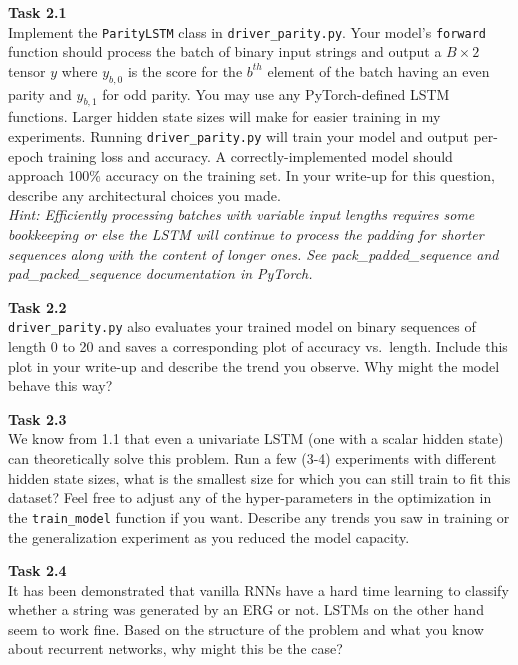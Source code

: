 \documentclass[12pt,article]{article}
\newenvironment{task}[2][Task]
    { \begin{mdframed}[backgroundcolor=gray!20] \textbf{#1 #2} \\}
    {  \end{mdframed}}
\begin{document}
\newpage
\begin{task}{2.1} 
Implement the \texttt{ParityLSTM} class in \texttt{driver\_parity.py}. Your model's \texttt{forward} function should process the batch of binary input strings and output a $B \times 2$ tensor $y$ where $y_{b,0}$ is the score for the $b^{th}$ element of the batch having an even parity and $y_{b,1}$ for odd parity. You may use any PyTorch-defined LSTM functions. Larger hidden state sizes will make for easier training in my experiments. Running \texttt{driver\_parity.py} will train your model and output per-epoch training loss and accuracy. A correctly-implemented model should approach 100\% accuracy on the training set. In your write-up for this question, describe any architectural choices you made.\\[5pt]

\emph{Hint: Efficiently processing batches with variable input lengths requires some bookkeeping or else the LSTM will continue to process the padding for shorter sequences along with the content of longer ones. See pack\_padded\_sequence and pad\_packed\_sequence documentation in PyTorch.}
\end{task}

\begin{task}{2.2} 
\texttt{driver\_parity.py} also evaluates your trained model on binary sequences of length 0 to 20 and saves a corresponding plot of accuracy vs.~length. Include this plot in your write-up and describe the trend you observe. Why might the model behave this way?
\end{task}

\begin{task}{2.3} 
We know from 1.1 that even a univariate LSTM (one with a scalar hidden state) can theoretically solve this problem. Run a few (3-4) experiments with different hidden state sizes, what is the smallest size for which you can still train to fit this dataset? Feel free to adjust any of the hyper-parameters in the optimization in the \texttt{train\_model} function if you want. Describe any trends you saw in training or the generalization experiment as you reduced the model capacity.
\end{task}

\begin{task}{2.4} 
It has been demonstrated that vanilla RNNs have a hard time learning to classify whether a string was generated by an ERG or not. LSTMs on the other hand seem to work fine. Based on the structure of the problem and what you know about recurrent networks, why might this be the case? 
\end{task}
\end{document}
